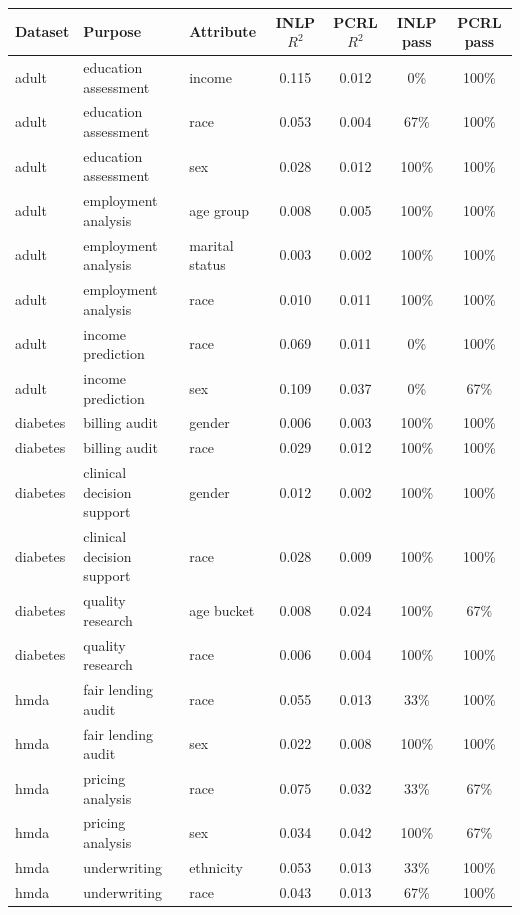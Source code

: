 \begin{tabular}{lllcccc}
\toprule
Dataset & Purpose & Attribute & INLP $R^2$ & PCRL $R^2$ & INLP pass & PCRL pass \\
\midrule
adult & education assessment & income & 0.115 & 0.012 & 0\% & 100\% \\
adult & education assessment & race & 0.053 & 0.004 & 67\% & 100\% \\
adult & education assessment & sex & 0.028 & 0.012 & 100\% & 100\% \\
adult & employment analysis & age group & 0.008 & 0.005 & 100\% & 100\% \\
adult & employment analysis & marital status & 0.003 & 0.002 & 100\% & 100\% \\
adult & employment analysis & race & 0.010 & 0.011 & 100\% & 100\% \\
adult & income prediction & race & 0.069 & 0.011 & 0\% & 100\% \\
adult & income prediction & sex & 0.109 & 0.037 & 0\% & 67\% \\
diabetes & billing audit & gender & 0.006 & 0.003 & 100\% & 100\% \\
diabetes & billing audit & race & 0.029 & 0.012 & 100\% & 100\% \\
diabetes & clinical decision support & gender & 0.012 & 0.002 & 100\% & 100\% \\
diabetes & clinical decision support & race & 0.028 & 0.009 & 100\% & 100\% \\
diabetes & quality research & age bucket & 0.008 & 0.024 & 100\% & 67\% \\
diabetes & quality research & race & 0.006 & 0.004 & 100\% & 100\% \\
hmda & fair lending audit & race & 0.055 & 0.013 & 33\% & 100\% \\
hmda & fair lending audit & sex & 0.022 & 0.008 & 100\% & 100\% \\
hmda & pricing analysis & race & 0.075 & 0.032 & 33\% & 67\% \\
hmda & pricing analysis & sex & 0.034 & 0.042 & 100\% & 67\% \\
hmda & underwriting & ethnicity & 0.053 & 0.013 & 33\% & 100\% \\
hmda & underwriting & race & 0.043 & 0.013 & 67\% & 100\% \\
\bottomrule
\end{tabular}
